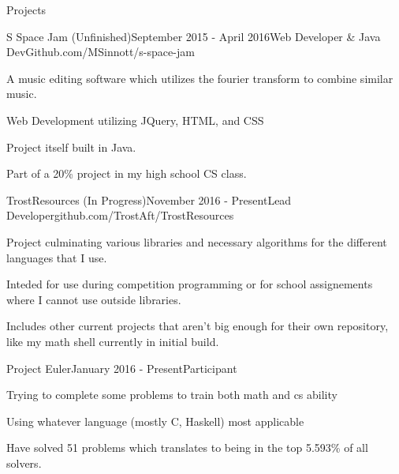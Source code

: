 \documentclass{resume} %
\begin{document}
\begin{rSection}{Projects}

\begin{rSubsection}{S Space Jam (Unfinished)}{September 2015 - April 2016}{Web Developer & Java Dev}{Github.com/MSinnott/s-space-jam}
\item A music editing software which utilizes the fourier transform to combine similar music.
\item Web Development utilizing JQuery, HTML, and CSS
\item Project itself built in Java.
\item Part of a 20\% project in my high school CS class.
\end{rSubsection}


\begin{rSubsection}{TrostResources (In Progress)}{November 2016 - Present}{Lead Developer}{github.com/TrostAft/TrostResources}
\item Project culminating various libraries and necessary algorithms for the different languages that I use. 
\item Inteded for use during competition programming or for school assignements where I cannot use outside libraries.
\item Includes other current projects that aren't big enough for their own repository, like my math shell currently in initial build.
\end{rSubsection}


\begin{rSubsection}{Project Euler}{January 2016 - Present}{Participant}
\item Trying to complete some problems to train both math and cs ability
\item Using whatever language (mostly C, Haskell) most applicable
\item Have solved 51 problems which translates to being in the top 5.593\% of all solvers. 
\end{rSubsection}

\end{rSection}

\end{document}

